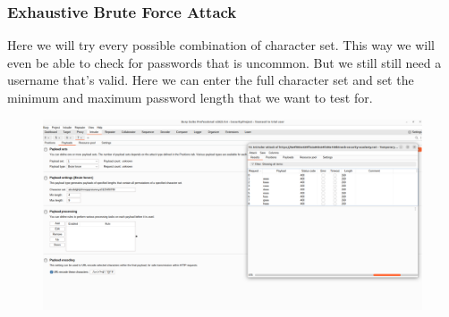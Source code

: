 \documentclass[
	a4paper, %
	12pt, %
]{CSSullivanBusinessReport}
\begin{document}
\subsubsection*{Exhaustive Brute Force Attack}
\begin{fullwidth}
    Here we will try every possible combination of character set. This way we will even be able to check for passwords that is uncommon. But we still still need a username that’s valid. Here we can enter the full character set and set the minimum and maximum password length that we want to test for.

    \begin{figure}[H]
    \centering
    \includegraphics[width=1\textwidth]{Images/anikaScreensots/exaustiveBruteForce.png}
    \caption{}
    \label{fig:enter-label}
\end{figure}
\end{fullwidth}
\end{document}
